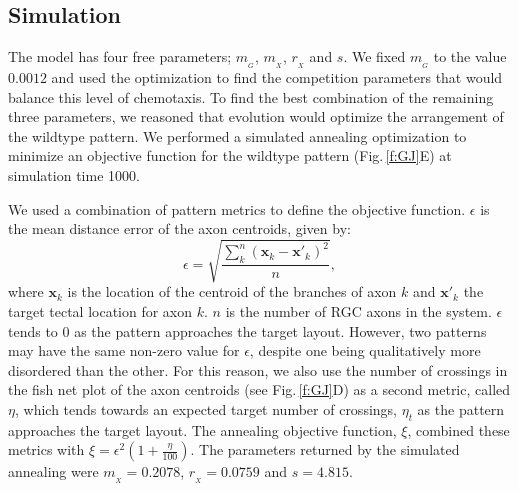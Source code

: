 \documentclass[11pt, a4paper]{article}
\begin{document}
\subsection*{Simulation}

The model has four free parameters; $m_{\!_G}$, $m_{\!_X}$, $r_{\!_X}$ and $s$. We fixed $m_{\!_G}$ to the value $0.0012$ and used the optimization to find the competition parameters that would balance this level of chemotaxis.
To find the best combination of the remaining three parameters, we reasoned that evolution would optimize the arrangement of the wildtype pattern.
We performed a simulated annealing optimization to minimize an objective function for the wildtype pattern (Fig.\,\ref{f:GJ}E) at simulation time 1000.

We used a combination of pattern metrics to define the objective function. $\epsilon$ is the mean distance error of the axon centroids, given by:
%
\begin{equation}\label{e:eps}
\epsilon = \sqrt{\frac{\sum_k^n (\mathbf{x}_{k} - \mathbf{x}'_{k})^2}{n}},
\end{equation}
%
where $\mathbf{x}_{k}$ is the location of the centroid of the branches of axon $k$ and $\mathbf{x}'_{k}$ the target tectal location for axon $k$.
$n$ is the number of RGC axons in the system.
%
$\epsilon$ tends to 0 as the pattern approaches the target layout.
However, two patterns may have the same non-zero value for $\epsilon$, despite one being qualitatively more disordered than the other.
For this reason, we also use the number of crossings in the fish net plot of the axon centroids (see Fig.\,\ref{f:GJ}D) as a second metric, called $\eta$, which tends towards an expected target number of crossings, $\eta_t$ as the pattern approaches the target layout. The annealing objective function, $\xi$, combined these metrics with $\xi = \epsilon^2 (1+\frac{\eta}{100})$.
The parameters returned by the simulated annealing were
$m_{\!_X} = 0.2078$, $r_{\!_X} = 0.0759$ and $s = 4.815$.
\end{document}
